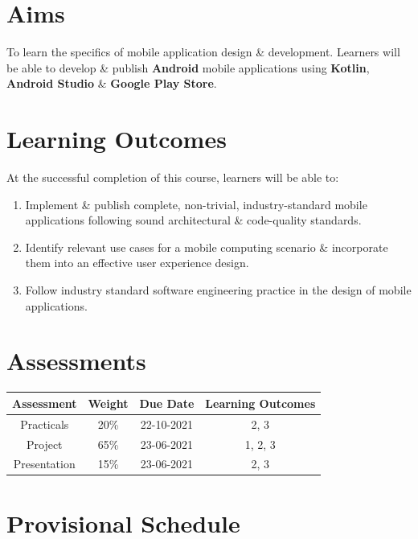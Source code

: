 \documentclass{article}
\begin{document}
\section*{Aims}
To learn the specifics of mobile application design \& development. Learners will be able to develop \& publish \textbf{Android} mobile applications using \textbf{Kotlin}, \textbf{Android Studio} \& \textbf{Google Play Store}.

\section*{Learning Outcomes}
At the successful completion of this course, learners will be able to: 
\begin{enumerate}
	\item Implement \& publish complete, non-trivial, industry-standard mobile applications following sound architectural \& code-quality standards.
	\item Identify relevant use cases for a mobile computing scenario \& incorporate them into an effective user experience design.
	\item Follow industry standard software engineering practice in the design of mobile applications.
\end{enumerate} 

\section*{Assessments}
\renewcommand{\arraystretch}{1.5}	
\begin{tabular}{|c|c|c|c|}
	\hline
	\textbf{Assessment} & \textbf{Weight} & \textbf{Due Date} & \textbf{Learning Outcomes} \\ \hline
	Practicals          & 20\%            & 22-10-2021        & 2, 3                       \\ \hline
	Project             & 65\%            & 23-06-2021        & 1, 2, 3                    \\ \hline
	Presentation        & 15\%            & 23-06-2021        & 2, 3                   \\ \hline
\end{tabular} 

\section*{Provisional Schedule}
\end{document}
